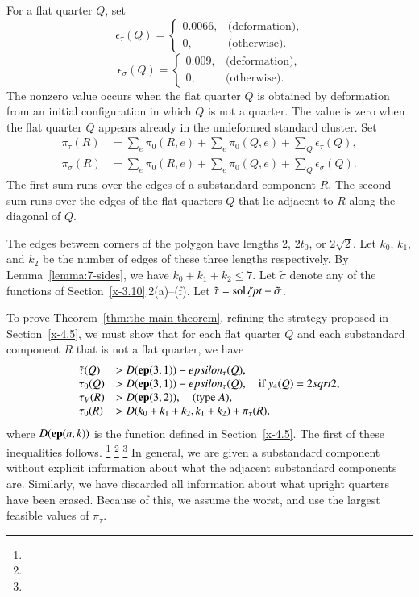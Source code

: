 For a flat quarter $Q$, set
    $$
    \epsilon_\tau(Q) =
        \begin{cases} 0.0066,&\text{(deformation),}\\
            0,&\text{(otherwise)}.
        \end{cases}
    $$
    $$
    \epsilon_\sigma(Q) =
        \begin{cases}
         0.009,&\text{(deformation),}\\
            0,&\text{(otherwise)}.
        \end{cases}
    $$
The nonzero value occurs when the flat quarter $Q$ is obtained by
deformation from an initial configuration in which $Q$ is not a quarter.
The value is zero when the flat quarter $Q$ appears already in the
undeformed standard cluster. Set
    $$
    \begin{array}{lll}
    \pi_\tau(R) &= \sum_e \pi_0(R,e) +
    \sum_e\pi_0(Q,e)+\sum_Q \epsilon_\tau(Q),\\
    \pi_\sigma(R)&=\sum_e \pi_0(R,e) +
    \sum_e\pi_0(Q,e)+\sum_Q \epsilon_\sigma(Q).
    \end{array}
    $$
The first sum runs over the edges of a substandard component $R$.  The second sum
runs over the edges of the flat quarters $Q$ that lie adjacent to $R$
along the diagonal of $Q$.

The edges between corners of the polygon have lengths $2$, $2t_0$, or
$2\sqrt{2}$.  Let $k_0$, $k_1$, and $k_2$ be the number of edges of
these three lengths respectively.  By Lemma~\ref{lemma:7-sides}, we have
$k_0+k_1+k_2\le7$. Let $\tilde\sigma$ denote any of the functions of
Section~\ref{x-3.10}.2(a)--(f). Let $\tilde\tau = \operatorname{sol}\zeta\hbox{\it pt} -
\tilde\sigma$.

To prove Theorem~\ref{thm:the-main-theorem}, refining the strategy
proposed in Section~\ref{x-4.5}, we must show that for each flat quarter
$Q$ and each substandard component $R$ that is not a flat quarter, we have
    \begin{equation}
    \begin{array}{lll}
    \tilde\tau(Q) &> D({\operatorname{\bf ep}}{(3,1)}) - epsilon_\tau(Q),\\
    \tau_0(Q) &> D({\operatorname{\bf ep}}{(3,1)})-epsilon_\tau(Q),\quad\text{if }y_4(Q)=2sqrt2,\\
    \tau_V(R) &> D({\operatorname{\bf ep}}{(3,2)}),\quad\text{(type $A$)},\\
    \tau_0(R) &> D(k_0+k_1+k_2,k_1+k_2)+\pi_\tau(R),
    \label{eqn:tau>D(n,k)}
    \end{array}
    \end{equation}
where $D({\operatorname{\bf ep}}{(n,k)})$ is the function defined in Section~\ref{x-4.5}. The first
of these inequalities follows.%
\footnote{} %
\footnote{} %
\footnote{} %
In general,
we are given a substandard component without explicit information about what the
adjacent substandard components are.  Similarly, we have discarded all information
about what upright quarters have been erased.  Because of this, we
assume the worst, and use the largest feasible values of $\pi_\tau$.

